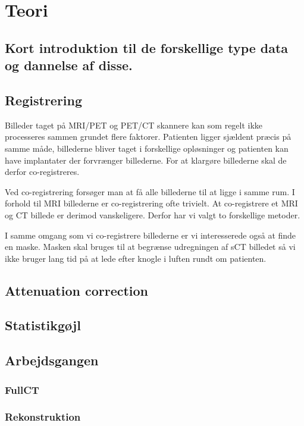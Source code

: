 \section{Teori}
\subsection{Kort introduktion til de forskellige type data og dannelse af disse.}


\subsection{Registrering}


Billeder taget på MRI/PET og PET/CT skannere kan som regelt ikke processeres sammen
grundet flere faktorer. Patienten ligger sjældent præcis på samme måde, billederne
bliver taget i forskellige opløsninger og patienten kan have implantater der
forvrænger billederne. For at klargøre billederne skal de derfor co-registreres.

Ved co-registrering forsøger man at få alle billederne til at ligge i samme rum.
I forhold til MRI billederne er co-registrering ofte trivielt. At co-registrere
et MRI og CT billede er derimod vanskeligere. Derfor har vi valgt to forskellige
metoder.

I samme omgang som vi co-registrere billederne er vi interesserede også at finde
en maske. Masken skal bruges til at begrænse udregningen af sCT billedet så vi
ikke bruger lang tid på at lede efter knogle i luften rundt om patienten.

\subsection{Attenuation correction}


\subsection{Statistikgøjl}


\subsection{Arbejdsgangen}


\subsubsection{FullCT}


\subsubsection{Rekonstruktion}

